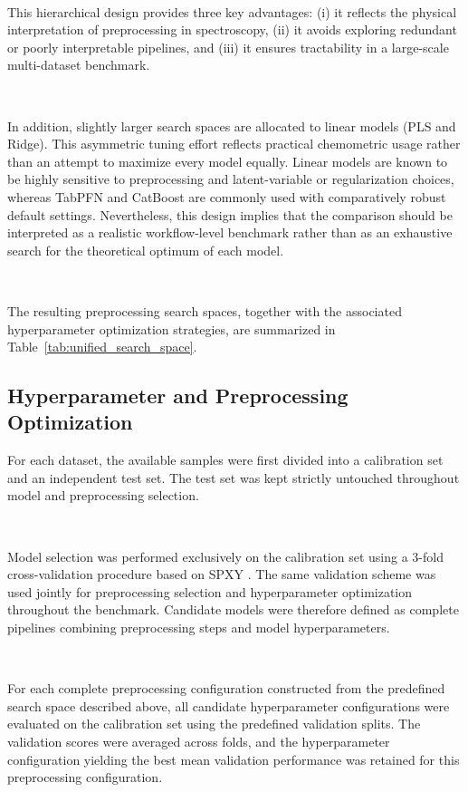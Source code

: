 \documentclass{article}
\begin{document}
~

This hierarchical design provides three key advantages: (i) it reflects the physical interpretation of preprocessing in spectroscopy, (ii) it avoids exploring redundant or poorly interpretable pipelines, and (iii) it ensures tractability in a large-scale multi-dataset benchmark.

~

In addition, slightly larger search spaces are allocated to linear models (PLS and Ridge). This asymmetric tuning effort reflects practical chemometric usage rather than an attempt to maximize every model equally. Linear models are known to be highly sensitive to preprocessing and latent-variable or regularization choices, whereas TabPFN and CatBoost are commonly used with comparatively robust default settings. Nevertheless, this design implies that the comparison should be interpreted as a realistic workflow-level benchmark rather than as an exhaustive search for the theoretical optimum of each model.

~

The resulting preprocessing search spaces, together with the associated hyperparameter optimization strategies, are summarized in Table~\ref{tab:unified_search_space}.





\subsection{Hyperparameter and Preprocessing Optimization}

For each dataset, the available samples were first divided into a calibration set and an independent test set. The test set was kept strictly untouched throughout model and preprocessing selection.

~

Model selection was performed exclusively on the calibration set using a  3-fold cross-validation procedure based on SPXY \cite{Galvao2005KS}. The same validation scheme was used jointly for preprocessing selection and hyperparameter optimization throughout the benchmark. Candidate models were therefore defined as complete pipelines combining preprocessing steps and model hyperparameters.

~

For each complete preprocessing configuration constructed from the predefined search space described above, all candidate hyperparameter configurations were evaluated on the calibration set using the predefined validation splits. The validation scores were averaged across folds, and the hyperparameter configuration yielding the best mean validation performance was retained for this preprocessing configuration.
\end{document}

